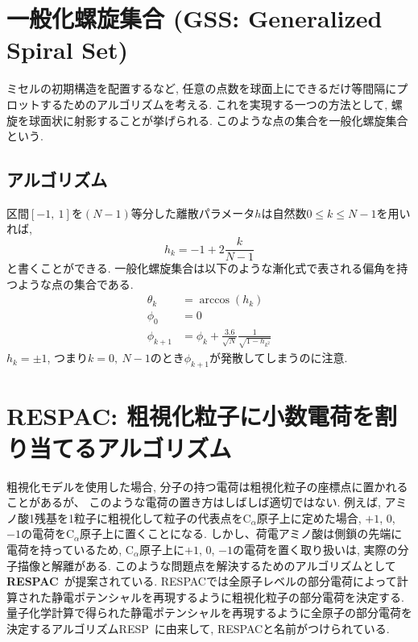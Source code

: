 \section{一般化螺旋集合 (GSS: Generalized Spiral Set)}
ミセルの初期構造を配置するなど, 任意の点数を球面上にできるだけ等間隔にプロットするためのアルゴリズムを考える. 
これを実現する一つの方法として, 螺旋を球面状に射影することが挙げられる. 
このような点の集合を一般化螺旋集合という. 

\subsection{アルゴリズム}
区間$[-1,~1]$を$(N-1)$等分した離散パラメータ$h$は自然数$0\le k \le N-1$を用いれば, 
\begin{equation}
    h_{k} = -1 + 2 \frac{k}{N-1}
\end{equation}
と書くことができる. 
一般化螺旋集合は以下のような漸化式で表される偏角を持つような点の集合である. 
\begin{align}
    \theta_{k} &= \arccos(h_{k}) \\
    \phi_{0} &= 0 \\
    \phi_{k+1} &= \phi_{k} + \frac{3.6}{\sqrt{N}} \frac{1}{\sqrt{1-h_{k^{2}}}}
\end{align}
$h_{k} = \pm 1$, つまり$k=0,~N-1$のとき$\phi_{k+1}$が発散してしまうのに注意. 

\clearpage

\section{RESPAC: 粗視化粒子に小数電荷を割り当てるアルゴリズム}
粗視化モデルを使用した場合, 分子の持つ電荷は粗視化粒子の座標点に置かれることがあるが、
このような電荷の置き方はしばしば適切ではない.
例えば, アミノ酸1残基を1粒子に粗視化して粒子の代表点をC$_\alpha$原子上に定めた場合, $+1$, $0$, $-1$の電荷をC$_\alpha$原子上に置くことになる. しかし、荷電アミノ酸は側鎖の先端に電荷を持っているため, C$_\alpha$原子上に$+1$, $0$, $-1$の電荷を置く取り扱いは, 実際の分子描像と解離がある.
このような問題点を解決するためのアルゴリズムとして\textbf{RESPAC}~\cite{Terakawa2014}が提案されている.
RESPACでは全原子レベルの部分電荷によって計算された静電ポテンシャルを再現するように粗視化粒子の部分電荷を決定する.
量子化学計算で得られた静電ポテンシャルを再現するように全原子の部分電荷を決定するアルゴリズムRESP~\cite{Bayly1993, Besler1990}に由来して, RESPACと名前がつけられている.

